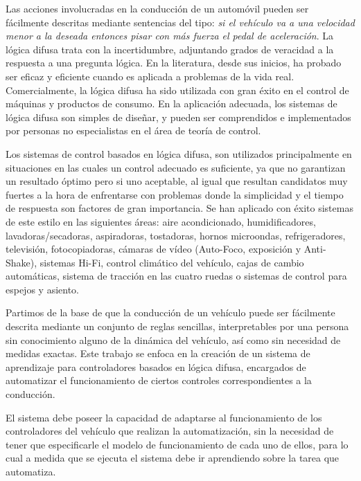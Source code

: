 Las acciones involucradas en la conducción de un automóvil pueden ser fácilmente descritas mediante sentencias del tipo: \textit{si el vehículo va a una velocidad menor a la deseada entonces pisar con más fuerza el pedal de aceleración}.  
La lógica difusa trata con la incertidumbre, adjuntando grados de veracidad a la respuesta a una pregunta lógica. En la literatura, desde sus inicios, ha probado ser eficaz y eficiente cuando es aplicada a problemas de la vida real\cite{king}\cite{larsen}\cite{ross}. Comercialmente, la lógica difusa ha sido utilizada con gran éxito en el control de máquinas y productos de consumo. En la aplicación adecuada, los sistemas de lógica difusa son simples de diseñar, y pueden ser comprendidos e implementados por personas no especialistas en el área de teoría de control. 

Los sistemas de control basados en lógica difusa, son utilizados principalmente en situaciones en las cuales un control adecuado es suficiente, ya que no garantizan un resultado óptimo pero si uno aceptable, al igual que resultan candidatos muy fuertes a la hora de enfrentarse con problemas donde la simplicidad y el tiempo de respuesta son factores de gran importancia. Se han aplicado con éxito sistemas de este estilo en las siguientes áreas: aire acondicionado, humidificadores, lavadoras/secadoras, aspiradoras, tostadoras, hornos microondas, refrigeradores, televisión, fotocopiadoras, cámaras de vídeo (Auto-Foco, exposición y Anti-Shake), sistemas Hi-Fi, control climático del vehículo, cajas de cambio automáticas, sistema de tracción en las cuatro ruedas o sistemas de control para espejos y asiento.

\label{sec:planteamiento}

Partimos de la base de que la conducción de un vehículo puede ser fácilmente descrita mediante un conjunto de reglas sencillas, interpretables por una persona sin conocimiento alguno de la dinámica del vehículo, así como sin necesidad de medidas exactas. Este trabajo se enfoca en la creación de un sistema de aprendizaje para controladores basados en lógica difusa, encargados de automatizar el funcionamiento de ciertos controles correspondientes a la conducción. 

El sistema debe poseer la capacidad de adaptarse al funcionamiento de los controladores del vehículo que realizan la automatización, sin la necesidad de tener que especificarle el modelo de funcionamiento de cada uno de ellos, para lo cual a medida que se ejecuta el sistema debe ir aprendiendo sobre la tarea que automatiza.

